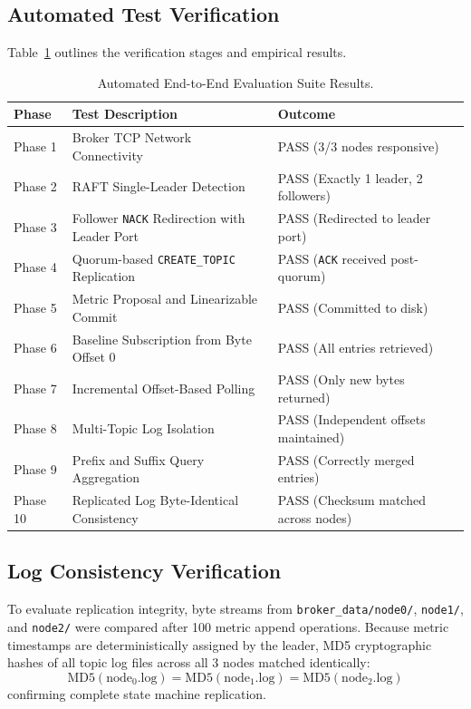 \documentclass[11pt,a4paper]{article}
\begin{document}
\subsection{Automated Test Verification}
Table~\ref{tab:test_results} outlines the verification stages and empirical results.

\begin{table}[H]
\centering
\small
\begin{tabular}{@{}lll@{}}
\toprule
\textbf{Phase} & \textbf{Test Description} & \textbf{Outcome} \\ \midrule
Phase 1 & Broker TCP Network Connectivity & PASS (3/3 nodes responsive) \\
Phase 2 & RAFT Single-Leader Detection & PASS (Exactly 1 leader, 2 followers) \\
Phase 3 & Follower \texttt{NACK} Redirection with Leader Port & PASS (Redirected to leader port) \\
Phase 4 & Quorum-based \texttt{CREATE\_TOPIC} Replication & PASS (\texttt{ACK} received post-quorum) \\
Phase 5 & Metric Proposal and Linearizable Commit & PASS (Committed to disk) \\
Phase 6 & Baseline Subscription from Byte Offset 0 & PASS (All entries retrieved) \\
Phase 7 & Incremental Offset-Based Polling & PASS (Only new bytes returned) \\
Phase 8 & Multi-Topic Log Isolation & PASS (Independent offsets maintained) \\
Phase 9 & Prefix and Suffix Query Aggregation & PASS (Correctly merged entries) \\
Phase 10 & Replicated Log Byte-Identical Consistency & PASS (Checksum matched across nodes) \\ \bottomrule
\end{tabular}
\caption{Automated End-to-End Evaluation Suite Results.}
\label{tab:test_results}
\end{table}

\subsection{Log Consistency Verification}
To evaluate replication integrity, byte streams from \texttt{broker\_data/node0/}, \texttt{node1/}, and \texttt{node2/} were compared after 100 metric append operations. Because metric timestamps are deterministically assigned by the leader, MD5 cryptographic hashes of all topic log files across all 3 nodes matched identically:
\begin{equation}
\text{MD5}(\text{node}_0.\text{log}) = \text{MD5}(\text{node}_1.\text{log}) = \text{MD5}(\text{node}_2.\text{log})
\end{equation}
confirming complete state machine replication.
\end{document}
